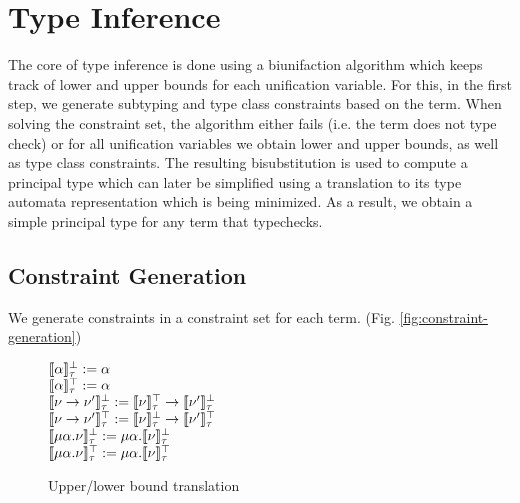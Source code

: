 \section{Type Inference}
\label{sec:type-inference}

The core of type inference is done using a biunifaction algorithm which keeps track of lower and upper bounds for each unification variable.
For this, in the first step, we generate subtyping and type class constraints based on the term.
When solving the constraint set, the algorithm either fails (i.e. the term does not type check) or for all unification variables we obtain lower and upper bounds, as well as type class constraints.
The resulting bisubstitution is used to compute a principal type which can later be simplified using a translation to its type automata representation which is being minimized.
As a result, we obtain a simple principal type for any term that typechecks.

\subsection{Constraint Generation}

We generate constraints in a constraint set for each term. (Fig. \ref{fig:constraint-generation})


\begin{figure}[h]
    \begin{center}
        $\llbracket \alpha \rrbracket_\tau^\bot := \alpha$ \\
        $\llbracket \alpha \rrbracket_\tau^\top := \alpha$ \\
        $\llbracket \nu \to \nu' \rrbracket_\tau^\bot := \llbracket \nu \rrbracket_\tau^\top \to \llbracket \nu' \rrbracket_\tau^\bot$ \\
        $\llbracket \nu \to \nu' \rrbracket_\tau^\top := \llbracket \nu \rrbracket_\tau^\bot \to \llbracket \nu' \rrbracket_\tau^\top$ \\
        $\llbracket \mu\alpha.\nu \rrbracket_\tau^\bot := \mu\alpha.\llbracket \nu \rrbracket_\tau^\bot$ \\
        $\llbracket \mu\alpha.\nu \rrbracket_\tau^\top := \mu\alpha.\llbracket \nu \rrbracket_\tau^\top$ \\
    \end{center}
    \caption{Upper/lower bound translation}
    \label{fig:bound-translation}
\end{figure}

